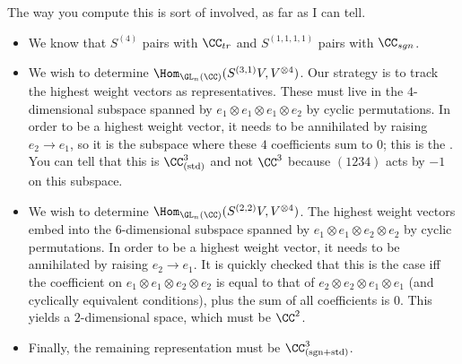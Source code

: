 \documentclass[11pt, headheight=30pt]{scrartcl}
\begin{document}
The way you compute this is sort of involved, as far as I can tell.
\begin{itemize}
    \item We know that $S^{(4)}$ pairs with $\CC_{tr}$ and $S^{(1,1,1,1)}$ pairs with $\CC_{sgn}$.
    \item We wish to determine $\Hom_{\GL_n(\CC)}(S^{(3,1)}V, V^{\otimes 4})$. Our strategy is to track the highest weight vectors as representatives. These must live in the $4$-dimensional subspace spanned by $e_1\otimes e_1\otimes e_1\otimes e_2$ by cyclic permutations. In order to be a highest weight vector, it needs to be annihilated by raising $e_2\to e_1$, so it is the subspace where these $4$ coefficients sum to $0$; this is the . You can tell that this is $\CC^3_{\text{(std)}}$ and not $\CC^3_{}$ because $(1234)$ acts by $-1$ on this subspace.
    \item We wish to determine $\Hom_{\GL_n(\CC)}(S^{(2,2)}V, V^{\otimes 4})$. The highest weight vectors embed into the $6$-dimensional subspace spanned by $e_1\otimes e_1\otimes e_2\otimes e_2$ by cyclic permutations. In order to be a highest weight vector, it needs to be annihilated by raising $e_2\to e_1$. It is quickly checked that this is the case iff the coefficient on $e_1\otimes e_1\otimes e_2\otimes e_2$ is equal to that of $e_2\otimes e_2\otimes e_1\otimes e_1$ (and cyclically equivalent conditions), plus the sum of all coefficients is $0$. This yields a $2$-dimensional space, which must be $\CC^2_{}$.
    \item Finally, the remaining representation must be $\CC^3_{\text{(sgn+std)}}$.
\end{itemize}
\end{document}
